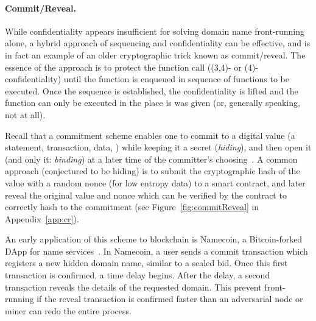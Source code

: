 

\paragraph{Commit/Reveal.}
\label{sec:comm}

While confidentiality appears insufficient for solving domain name front-running alone, a hybrid approach of sequencing and confidentiality can be effective, and is in fact an example of an older cryptographic trick known as commit/reveal. The essence of the approach is to protect the function call (\eg (3,4)- or (4)-confidentiality) until the function is enqueued in sequence of functions to be executed. Once the sequence is established, the confidentiality is lifted and the function can only be executed in the place is was given (or, generally speaking, not at all).

Recall that a commitment scheme enables one to commit to a digital value (\eg a statement, transaction, data, \etc) while keeping it a secret (\textit{hiding}), and then open it (and only it: \textit{binding}) at a later time of the committer's choosing~\cite{brassard1988minimum}. A common approach (conjectured to be hiding) is to submit the cryptographic hash of the value with a random nonce (for low entropy data) to a smart contract, and later reveal the original value and nonce which can be verified by the contract to correctly hash to the commitment (see Figure~\ref{fig:commitReveal} in Appendix~\ref{app:cr}).

An early application of this scheme to blockchain is Namecoin, a Bitcoin-forked DApp for name services~\cite{kalodner2015empirical}. In Namecoin, a user sends a commit transaction which registers a new hidden domain name, similar to a sealed bid. Once this first transaction is confirmed, a time delay begins. After the delay, a second transaction reveals the details of the requested domain. This prevent front-running if the reveal transaction is confirmed faster than an adversarial node or miner can redo the entire process.

